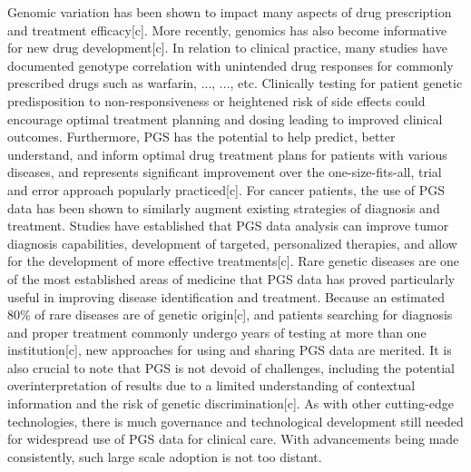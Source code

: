 \documentclass[11pt]{article}
\begin{document}
Genomic variation has been shown to impact many aspects of drug prescription and treatment efficacy[c]. More recently, genomics has also become informative for new drug development[c]. 
In relation to clinical practice, many studies have documented genotype correlation with unintended drug responses for commonly prescribed drugs such as warfarin, ..., ..., etc. 
Clinically testing for patient genetic predisposition to non-responsiveness or heightened risk of side effects could encourage optimal treatment planning and dosing leading to improved clinical outcomes. 
Furthermore, PGS has the potential to help predict, better understand, and inform optimal drug treatment plans for patients with various diseases, and represents significant improvement over the one-size-fits-all, trial and error approach popularly practiced[c]. 
For cancer patients, the use of PGS data has been shown to similarly augment existing strategies of diagnosis and treatment. Studies have established that PGS data analysis can improve tumor diagnosis capabilities, development of targeted, personalized therapies, and allow for the development of more effective treatments[c]. 
Rare genetic diseases are one of the most established areas of medicine that PGS data has proved particularly useful in improving disease identification and treatment. 
Because an estimated 80\% of rare diseases are of genetic origin[c], and patients searching for diagnosis and proper treatment commonly undergo years of testing at more than one institution[c], new approaches for using and sharing PGS data are merited. 
It is also crucial to note that PGS is not devoid of challenges, including the potential overinterpretation of results due to a limited understanding of contextual information and the risk of genetic discrimination[c]. 
As with other cutting-edge technologies, there is much governance and technological development still needed for widespread use of PGS data for clinical care. 
With advancements being made consistently, such large scale adoption is not too distant.
\end{document}
